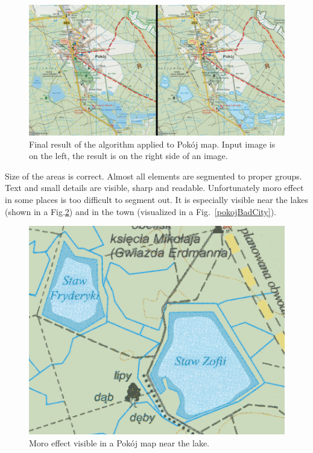 \documentclass[a4paper,onecolumn,oneside,12pt]{memoir}
\begin{document}
\begin{figure}[!ht]
\begin{center}
\includegraphics[scale=0.2]{images/pokojFinalResult.png}
\caption{Final result of the algorithm applied to Pokój map. Input image is on the left, the result
is on the right side of an image.}
\label{pokojResult}
\end{center}
\end{figure}

Size of the areas is correct. Almost all elements are segmented to proper groups. Text and small
details are visible, sharp and readable. Unfortunately moro effect in some places is too difficult
to segment out. It is especially visible near the lakes (shown in a Fig.\ref{pokojBadLake}) and in
the town (visualized in a Fig.~\ref{pokojBadCity}).

\begin{figure}[!ht]
\begin{center}
\includegraphics[scale=0.3]{images/pokojBadLake.png}
\caption{Moro effect visible in a Pokój map near the lake.}
\label{pokojBadLake}
\end{center}
\end{figure}
\end{document}
